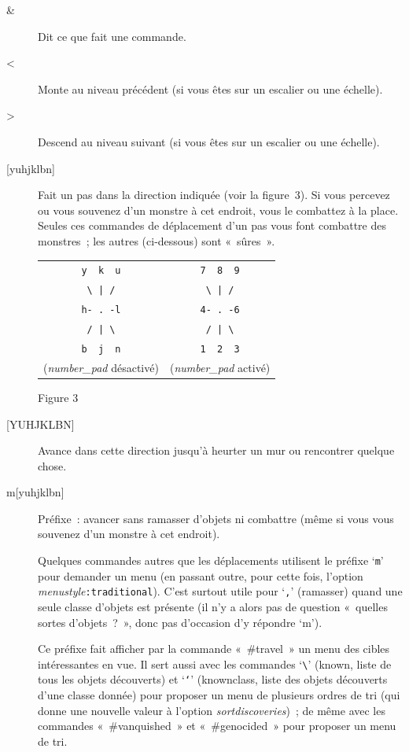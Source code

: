 \documentclass[titlepage]{article}
\begin{document}
\begin{description}
\item[{\&}]
Dit ce que fait une commande.

\item[{\textless{}}]
Monte au niveau précédent (si vous êtes sur un escalier ou une échelle).

\item[{\textgreater{}}]
Descend au niveau suivant (si vous êtes sur un escalier ou une échelle).

\item[{[yuhjklbn]}]
Fait un pas dans la direction indiquée (voir la figure~3).
Si vous percevez ou vous souvenez d'un monstre à cet endroit, vous le
combattez à la place.
Seules ces commandes de déplacement d'un pas vous font combattre des
monstres~; les autres (ci-dessous) sont «~sûres~».
\begin{center}
\begin{tabular}{cc}
\verb+   y  k  u   + & \verb+   7  8  9   +\\
\verb+    \ | /    + & \verb+    \ | /    +\\
\verb+   h- . -l   + & \verb+   4- . -6   +\\
\verb+    / | \    + & \verb+    / | \    +\\
\verb+   b  j  n   + & \verb+   1  2  3   +\\
(\textit{number\_pad} désactivé) & (\textit{number\_pad} activé)
\end{tabular}
\end{center}
\begin{center}
Figure 3
\end{center}

\item[{[YUHJKLBN]}]
Avance dans cette direction jusqu'à heurter un mur ou rencontrer quelque
chose.

\item[{m[yuhjklbn]}]
Préfixe~: avancer sans ramasser d'objets ni combattre (même si vous vous
souvenez d'un monstre à cet endroit).


Quelques commandes autres que les déplacements utilisent le préfixe
`\texttt{m}' pour demander un menu (en passant outre, pour cette fois,
l'option
\textit{menustyle}\texttt{:traditional}).
C'est surtout utile pour `\texttt{,}' (ramasser) quand une seule classe
d'objets est présente (il n'y a alors pas de question «~quelles sortes
d'objets~?~», donc pas d'occasion d'y répondre `m').


Ce préfixe fait afficher par la commande «~\#travel~» un menu des
cibles intéressantes en vue.
Il sert aussi avec les commandes `\texttt{\textbackslash{}}' (known, liste de tous les
objets découverts) et `\texttt{`}' (knownclass, liste des objets
découverts d'une classe donnée) pour proposer un menu de plusieurs ordres
de tri (qui donne une nouvelle valeur à l'option
\textit{sortdiscoveries})~;
de même avec les commandes «~\#vanquished~» et «~\#genocided~»
pour proposer un menu de tri.



\end{description}
\end{document}
